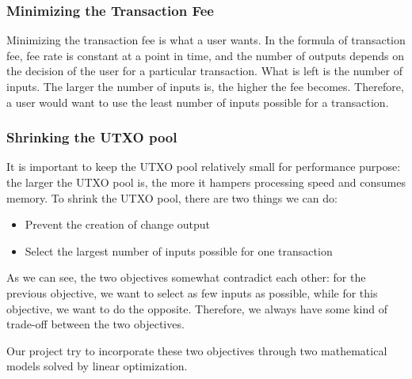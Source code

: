       \subsubsection{Minimizing the Transaction Fee}
        \par Minimizing the transaction fee is what a user wants. In the formula of transaction fee, fee rate is constant at a point in time, and the number of outputs depends on the decision of the user for a particular transaction. What is left is the number of inputs. The larger the number of inputs is, the higher the fee becomes. Therefore, a user would want to use the least number of inputs possible for a transaction.

      \subsubsection{Shrinking the UTXO pool}
        \par It is important to keep the UTXO pool relatively small for performance purpose: the larger the UTXO pool is, the more it hampers processing speed and consumes memory. To shrink the UTXO pool, there are two things we can do:

        \begin{itemize}
          \item Prevent the creation of change output
          \item Select the largest number of inputs possible for one transaction
        \end{itemize}

        \par As we can see, the two objectives somewhat contradict each other: for the previous objective, we want to select as few inputs as possible, while for this objective, we want to do the opposite. Therefore, we always have some kind of trade-off between the two objectives.

        \par Our project try to incorporate these two objectives through two mathematical models solved by linear optimization.

\clearpage
